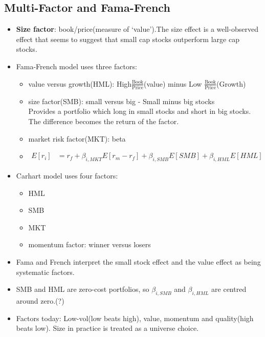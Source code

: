 \documentclass{maths}
\begin{document}
\subsection{Multi-Factor and Fama-French}
\begin{itemize}
\item \textbf{Size factor}: book/price(measure of `value').The size effect is a well-observed effect that seems to suggest that small cap stocks outperform large cap stocks.\\

\item Fama-French model uses three factors:
\begin{itemize}
\item value versus growth(HML): High$\frac{\text{Book}}{\text{Price}}$(value) minus Low $\frac{\text{Book}}{\text{Price}}$(Growth)
\item size factor(SMB): small versus big - Small minus big stocks\\
Provides a portfolio which long in small stocks and short in big stocks. The difference becomes the return of the factor.
\item market risk factor(MKT): beta
\item 
\begin{align*}
E[r_i] &=r_f+\beta_{i,MKT}E[r_m-r_f]+\beta_{i,SMB}E[SMB]+\beta_{i,HML}E[HML]
\end{align*}
\end{itemize}

\item Carhart model uses four factors:
\begin{itemize}
\item HML
\item SMB
\item MKT
\item momentum factor: winner versus losers
\end{itemize}
\item Fama and French interpret the small stock effect and the value effect as being systematic factors.
\item SMB and HML are zero-cost portfolios, so $\beta_{i,SMB}$ and $\beta_{i,HML}$ are centred around zero.(?)
\item Factors today: Low-vol(low beats high), value, momentum and quality(high beats low). Size in practice is treated as a universe choice.

\end{itemize}
\end{document}
